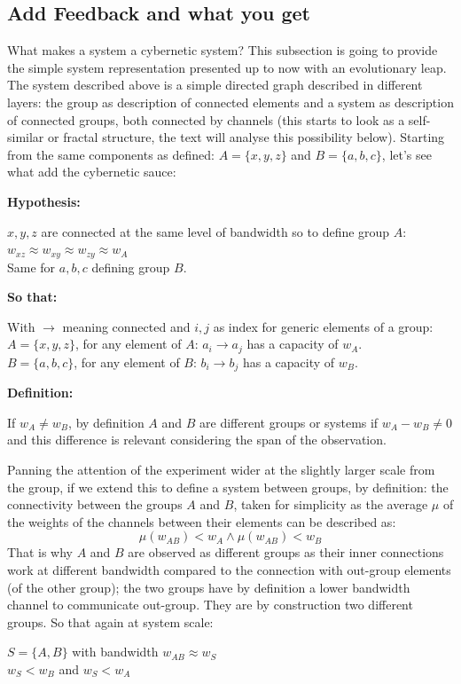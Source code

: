 \documentclass[14pt,a4paper]{extarticle}
\begin{document}
\subsection*{Add Feedback and what you get}
\label{subsec:feedback}
\hspace*{15mm}What makes a system a cybernetic system? This subsection is going to provide the simple system representation presented up to now with an evolutionary leap. The system described above is a simple directed graph described in different layers: the group as description of connected elements and a system as description of connected groups, both connected by channels (this starts to look as a self-similar or fractal structure, the text will analyse this possibility below). 
Starting from the same components as defined: \(A = \{x, y, z\}\) and \(B = \{a, b, c\}\), let’s see what add the cybernetic sauce:

\textbf{Hypothesis:}
\begin{center}
\(x, y, z\) are connected at the same level of bandwidth so to define group \(A\):\\
\(w_{xz} \approx w_{xy} \approx w_{zy} \approx w_A\)\\
Same for \(a, b, c\) defining group \(B\).
\end{center}
\textbf{So that:}
\newline
\begin{center}
With $\rightarrow$ meaning connected and \(i,j\) as index for generic elements of a group:\\
\(A = \{ x, y, z \}\),
for any element of \(A\): \(a_i \rightarrow a_j\) has a capacity of \(w_A\).\\
\(B = \{ a, b, c \}\),
for any element of \(B\): \(b_i \rightarrow b_j\) has a capacity of \(w_B\).\\
\end{center}
\textbf{Definition:}
\newline
\begin{center}
If \(w_A \neq w_B\), by definition \(A\) and \(B\) are different groups or systems if \(w_A - w_B \neq 0\) and this difference is relevant considering the span of the observation.
\end{center}

\hspace*{15mm}Panning the attention of the experiment wider at the slightly larger scale from the group, if we extend this to define a system between groups, by definition: the connectivity between the groups \(A\) and \(B\), taken for simplicity as the average $\mu$ of the weights of the channels between their elements can be described as:
\[\mu(w_{AB}) < w_A \wedge \mu(w_{AB}) < w_B\]
That is why \(A\) and \(B\) are observed as different groups as their inner connections work at different bandwidth compared to the connection with out-group elements (of the other group); the two groups have by definition a lower bandwidth channel to communicate out-group. They are by construction two different groups. So that again at system scale:
\begin{center}
\(S = \{ A, B \}\) with bandwidth \(w_{AB} \approx w_S\)\\
\(w_S < w_B\)  and  \(w_S < w_A\)
\end{center}
\end{document}
